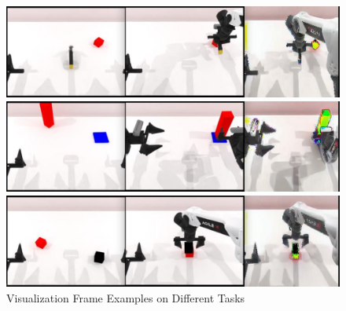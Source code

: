 \begin{figure}[htbp]
    \centering
    \begin{minipage}{0.45\textwidth}
        \centering
        \includegraphics[width=\textwidth]{figs/block_hammer_beat.png}
    \end{minipage}\hfill
    \begin{minipage}{0.45\textwidth}
        \centering
        \includegraphics[width=\textwidth]{figs/block_handover.png}  
    \end{minipage}\hfill
    \begin{minipage}{0.45\textwidth}
        \centering
        \includegraphics[width=\textwidth]{figs/block_stack_easy.png}  
    \end{minipage}
    \caption{Visualization Frame Examples on Different Tasks}
    \label{fig:visual_example}
\end{figure}